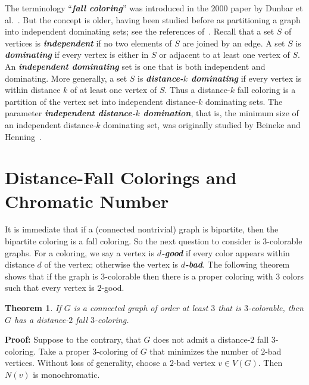 \documentclass[a4paper,11pt]{article}
\newtheorem{theorem}{Theorem}[section]
\numberwithin{equation}{theorem}
\newcommand{\dd}[1]{\textbf{\textit{#1}}}
\begin{document}
The terminology ``\dd{fall coloring}'' was introduced in the 2000 paper by Dunbar et al.~\cite{DHHJKLR}. 
But the concept is older, having been studied before as partitioning a graph into independent dominating sets;
see the references of~\cite{DHHJKLR}. Recall that a set $S$ of vertices is \dd{independent} if no two elements of $S$ are joined by an edge.
A set $S$ is \dd{dominating} if every vertex is either in $S$ or adjacent to at least one vertex of $S$.
An \dd{independent dominating} set is one that is both independent and dominating.
More generally, a set $S$ is \dd{distance-$k$ dominating} if every vertex is within distance $k$ of at least
one vertex of $S$. Thus a distance-$k$ fall coloring is a partition of the vertex set into independent distance-$k$ dominating sets.
The parameter \dd{independent distance-$k$ domination}, that is, the  
minimum size of an independent distance-$k$ dominating set,
was originally studied by Beineke and Henning~\cite{BH}.





 \section{Distance-Fall Colorings and Chromatic Number}\label{dfc&cn}

It is immediate that  if a (connected nontrivial) graph is bipartite, then the bipartite coloring is a fall coloring.
So the next question to consider is $3$-colorable graphs.
For a coloring, we say a vertex is \dd{$d$-good} if every color appears within distance $d$ of the vertex; otherwise the vertex
is \dd{$d$-bad}. The following theorem shows that if the graph is $3$-colorable then 
 there is a proper coloring with $3$ colors such that every vertex is $2$-good.

\begin{theorem} \label{t:threeGood}
If $G$ is a connected graph of order at least $3$ that is $3$-colorable, then $G$ has a distance-$2$ fall $3$-coloring.
\end{theorem}

{\bf Proof:} 
Suppose to the contrary, that $G$ does not admit a distance-$2$ fall $3$-coloring. 
Take a proper $3$-coloring of $G$ that minimizes the number of $2$-bad vertices. 
Without loss of generality, choose a $2$-bad vertex $v \in V(G)$. 
Then $N(v)$ is monochromatic.
\end{document}

